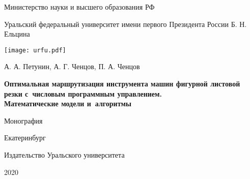 
\thispagestyle{empty}

\setcounter{page}{1}
\begin{center}
{\footnotesize
Министерство науки и высшего образования РФ

Уральский федеральный университет
имени первого Президента России
Б. Н. Ельцина
}
\texttt{[image: urfu.pdf]}

\vspace{0pt plus2fill}
А. А. Петунин,
А. Г. Ченцов,
П. А. Ченцов

\vspace{0pt plus1fill}
{\bf
Оптимальная маршрутизация инструмента машин фигурной
листовой резки с~числовым
программным управлением.\\
Математические модели и~алгоритмы}

\vspace{3cm}
Монография

\vspace{0pt plus6fill}
Екатеринбург

Издательство Уральского университета

2020
\end{center}
\newpage
